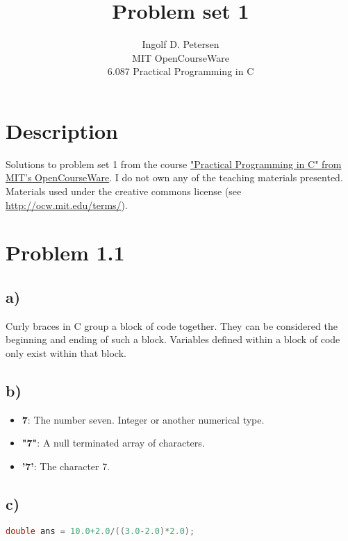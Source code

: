 \documentclass[12pt]{article}
\begin{document}
 
 
\title{Problem set 1}%
\author{Ingolf D. Petersen\\ %
MIT OpenCourseWare \\
6.087 Practical Programming in C} %
 
\maketitle
\section*{Description}
Solutions to problem set 1 from the course 
\href{http://ocw.mit.edu/courses/electrical-engineering-and-computer-science/6-087-practical-programming-in-c-january-iap-2010/index.htm}{"Practical Programming in C" from MIT's OpenCourseWare}. I do not own any of the teaching materials presented. Materials used under the creative commons license (see \href{http://ocw.mit.edu/terms/}{http://ocw.mit.edu/terms/}).


\section*{Problem 1.1}
\subsection*{a)}
Curly braces in C group a block of code together. They can be considered the beginning and ending of such a block. Variables defined within a block of code only exist within that block.

\subsection*{b)}
\begin{itemize}
\item \textbf{7}: The number seven. Integer or another numerical type.
\item \textbf{"7"}: A null terminated array of characters.
\item \textbf{'7'}: The character 7.
\end{itemize}

\subsection*{c)}
\begin{lstlisting}[frame=single, language=C]
double ans = 10.0+2.0/((3.0-2.0)*2.0);
\end{lstlisting}
\end{document}
